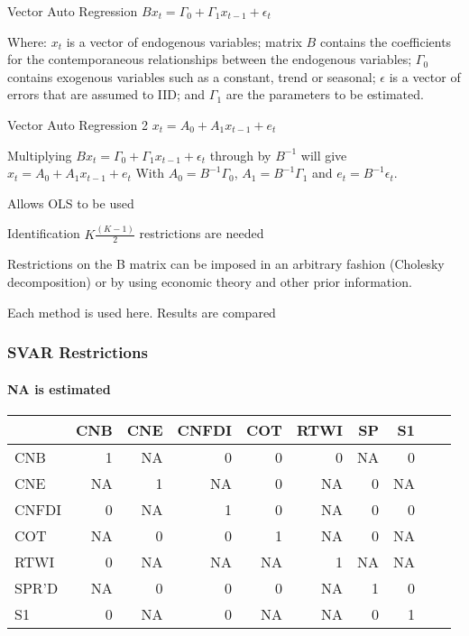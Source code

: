 \documentclass[14pt,xcolor=pdftex,dvipsnames,table]{beamer}
\begin{document}
\begin{frame}{Vector Auto Regression}
$Bx_{t}=\Gamma_{0}+\Gamma_{1}x_{t-1}+\epsilon_{t}$
\pause

\begin{block}{}
Where: $x_t$ is a vector of endogenous variables; matrix $B$ contains the coefficients for the contemporaneous relationships between the endogenous variables; $\Gamma_0$ contains exogenous variables such as a constant, trend or seasonal; $\epsilon$ is a vector of errors that are assumed to IID; and $\Gamma_1$ are the parameters to be estimated. 
\end{block}
\pause
\end{frame}

\begin{frame}{Vector Auto Regression 2}
$x_t=A_0+A_1x_{t-1}+e_t$
\pause

\begin{block}{}
Multiplying $Bx_{t}=\Gamma_{0}+\Gamma_{1}x_{t-1}+\epsilon_{t}$
through by $B^{-1}$ will give $x_t=A_0+A_1x_{t-1}+e_t$
With $A_0=B^{-1}\Gamma_0$, $A_1=B^{-1}\Gamma_1$ and $e_t=B^{-1}\epsilon_t$. 
\end{block}
\pause
\vskip1cm
Allows OLS to be used
\end{frame}

\begin{frame}{Identification}
$K\frac{(K-1)}{2}$ restrictions are needed
\pause

\begin{block}{}
Restrictions on the B matrix can be imposed in an arbitrary fashion (Cholesky decomposition) or by using economic theory and other prior information.  
\end{block}
\pause
\vskip1cm
Each method is used here.
\vskip1cm
Results are compared
\end{frame}

\begin{frame}
\frametitle{SVAR Restrictions}
\framesubtitle{NA is estimated}
\begin{center}
\begin{tabular}{lrrrrrrrrr}  
  \hline
 &  CNB & CNE & CNFDI & COT & RTWI & SP & S1 \\ 
  \hline
  CNB & 1 & NA & 0 & 0 & 0 & NA & 0\\ 
  CNE & NA & 1 & NA & 0 & NA & 0 & NA\\ 
  CNFDI & 0 & NA & 1 & 0 & NA & 0 & 0\\ 
  COT & NA & 0 & 0 & 1 & NA & 0 & NA \\ 
   RTWI & 0 & NA & NA & NA & 1 & NA & NA\\ 
  SPR'D & NA & 0 & 0 & 0 & NA & 1 & 0\\ 
  S1 & 0 & NA & 0 & NA & NA & 0 & 1\\ 
   \hline
\end{tabular}
\end{center}
\end{frame}
\end{document}
